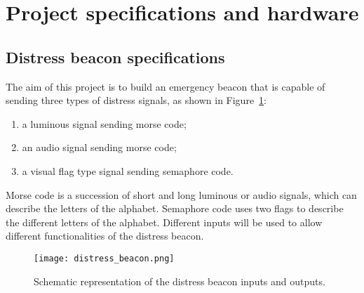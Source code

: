 \section{Project specifications and hardware}
\label{sec:project_specifications}

\subsection{Distress beacon specifications}

The aim of this project is to build an emergency beacon that is capable of sending three types of distress signals, as shown in Figure~\ref{fig:distress_beacon}: 
\begin{enumerate}
	\item a luminous signal sending morse code; 
	\item an audio signal sending morse code; 
	\item a visual flag type signal sending semaphore code. 
\end{enumerate}
Morse code is a succession of short and long luminous or audio signals, which can describe the letters of the alphabet. Semaphore code uses two flags to describe the different letters of the alphabet. Different inputs will be used to allow different functionalities of the distress beacon. 

\begin{figure}[h]
	\centering
	\texttt{[image: distress\_beacon.png]}
	\caption{Schematic representation of the distress beacon inputs and outputs. }
	\label{fig:distress_beacon}
\end{figure}

